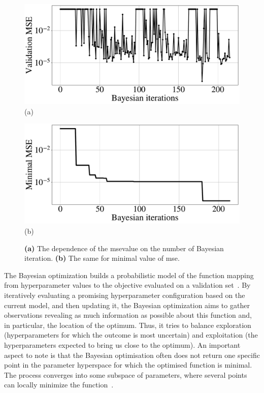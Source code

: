 \begin{figure}[t]
\centering
\begin{minipage}{.49\textwidth}
  \centering
  \includegraphics[width=.92\linewidth]{images/nn_nft/scirep_bayes.pdf} (a)
\end{minipage}%
\begin{minipage}{.49\textwidth}
  \centering
  \includegraphics[width=.92\linewidth]{images/nn_nft/scirep_bayes_min.pdf} (b)
\end{minipage}
\caption{\textbf{(a)} The dependence of the \acrshort{mse}value on the number of Bayesian iteration. \textbf{(b)} The same for minimal value of \acrshort{mse}.}
\label{fig:bayes_full}
\end{figure}


The Bayesian optimization builds a probabilistic model of the function mapping from hyperparameter values to the objective evaluated on a validation set~\cite{mockus1975bayesian,pelikan1999boa}. By iteratively evaluating a promising hyperparameter configuration based on the current model, and then updating it, the Bayesian optimization aims to gather observations revealing as much information as possible about this function and, in particular, the location of the optimum. Thus, it tries to balance exploration (hyperparameters for which the outcome is most uncertain) and exploitation (the hyperparameters expected to bring us close to the optimum).
An important aspect to note is that the Bayesian optimisation often does not return one specific point in the parameter hyperspace for which the optimised function is minimal. The process converges into some subspace of parameters, where several points can locally minimize the function~\cite{pelikan1999boa}.

